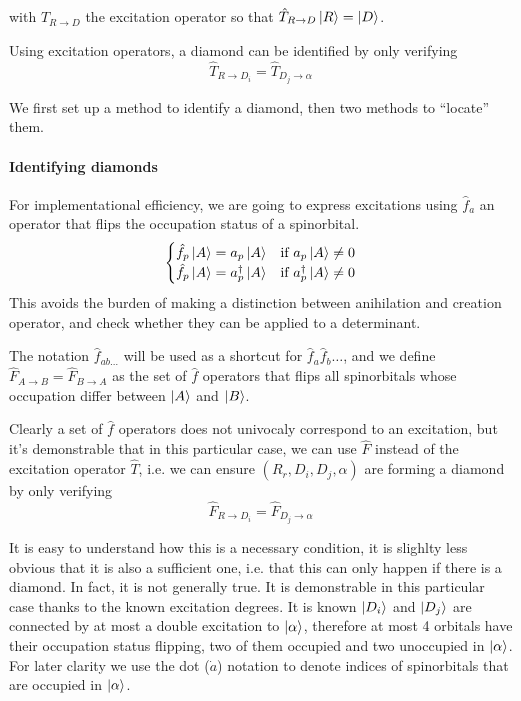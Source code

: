 \documentclass[./thesis.tex]{subfiles}
\begin{document}
with $\hat T_{R \rightarrow D}$ the excitation operator so that $\hat T_{R \rightarrow D} \ket R = \ket D$.



Using excitation operators, a diamond can be identified by only verifying
\begin{equation}
\hat T_{R \rightarrow D_i} = \hat T_{D_j \rightarrow \alpha}
\label{eq:excitation_diamond}
\end{equation}


We first set up a method to identify a diamond, then two methods to ``locate'' them.


\paragraph{Identifying diamonds}
For implementational efficiency, we are going to express excitations using $\hat f_a$ an operator that flips the occupation status of a spinorbital. 
\begin{align}
  \begin{cases}
  \hat f_p \ket A = a_p \ket A & \text{if }  a_p \ket A \neq 0\\
  \hat f_p \ket A = a^\dagger_p \ket A & \text{if }  a^\dagger_p  \ket A \neq 0\\
  \end{cases}
\end{align}
This avoids the burden of making a distinction between anihilation and creation operator, and check whether they can be applied to a determinant.


The notation $\hat f_{ab\ldots}$ will be used as a shortcut for $\hat f_a \hat f_b \ldots$, and we define $\hat F_{A \rightarrow B} = \hat F_{B \rightarrow A}$ as the set of $\hat f$ operators that flips all spinorbitals whose occupation differ between $\ket A$ and $\ket B$.

Clearly a set of $\hat f$ operators does not univocaly correspond to an excitation, but it's demonstrable that in this particular case, we can use $\hat F$ instead of the excitation operator $\hat T$, i.e. we can ensure $(R_r, D_i, D_j, \alpha)$ are forming a diamond by only verifying
\begin{equation}
\hat F_{R \rightarrow D_i} = \hat F_{D_j \rightarrow \alpha}
\label{eq:diamond_flip}
\end{equation}

It is easy to understand how this is a necessary condition, it is slighlty less obvious that it is also a sufficient one, i.e. that this can only happen if there is a diamond. In fact, it is not generally true. It is demonstrable in this particular case thanks to the known excitation degrees. It is known $\ket {D_i}$ and $\ket {D_j}$ are connected by at most a double excitation to ${\ket{\alpha}}$, therefore at most 4 orbitals have their occupation status flipping, two of them occupied and two unoccupied in ${\ket{\alpha}}$. For later clarity we use the dot ($\dot a$) notation to denote indices of spinorbitals that are occupied in ${\ket{\alpha}}$.
\end{document}
